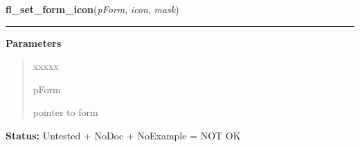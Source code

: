 \hspace{.8\funcindent}\begin{boxedminipage}{\funcwidth}

    \raggedright \textbf{fl\_set\_form\_icon}(\textit{pForm}, \textit{icon}, \textit{mask})

    \vspace{-1.5ex}

    \rule{\textwidth}{0.5\fboxrule}
\setlength{\parskip}{2ex}
\setlength{\parskip}{1ex}
      \textbf{Parameters}
      \vspace{-1ex}

      \begin{quote}
        \begin{Ventry}{xxxxx}

          \item[pForm]

          pointer to form

        \end{Ventry}

      \end{quote}

\textbf{Status:} Untested + NoDoc + NoExample = NOT OK



    \end{boxedminipage}

    \label{xformslib:library:fl_get_decoration_sizes}

    \vspace{0.5ex}

